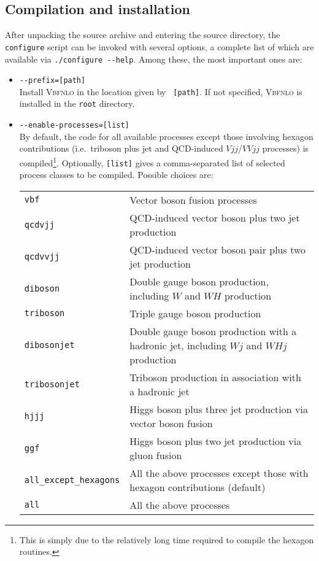 \documentclass[english,12pt]{article}
\begin{document}

\subsection{Compilation and installation}
\label{compilation}

After unpacking the source archive and entering the source directory, the {\tt
configure} script can be invoked with several options, a complete list of which are
available via {\tt ./configure~-{}-help}.  Among these, the most important ones
are:

\begin{itemize}
\item {\tt -{}-prefix=[path]} \\ Install \textsc{Vbfnlo} in the location given by {\tt
[path]}.  If not specified, \textsc{Vbfnlo} is installed in the {\tt root} directory.
\item {\tt -{}-enable-processes=[list]} \\ By default, the code for all
available processes except those involving hexagon contributions (i.e.\ triboson
plus jet and QCD-induced $Vjj$/$VVjj$ processes) is compiled\footnote{This is simply due to the relatively
long time required to compile the hexagon routines.}. Optionally, {\tt [list]}
gives a comma-separated list of selected process classes to be compiled. Possible
choices are:

\begin{tabular}{lp{}}
{\tt vbf} & Vector boson fusion processes \\ 
{\tt qcdvjj} & QCD-induced vector boson plus two jet production \\
{\tt qcdvvjj} & QCD-induced vector boson pair plus two jet production \\
{\tt diboson} & Double gauge boson production, including $W$ and $WH$ production \\ 
{\tt triboson} & Triple gauge boson production \\ 
{\tt dibosonjet} & Double gauge boson production with a hadronic jet, including $Wj$ and $WHj$ production \\ 
{\tt tribosonjet} & Triboson production in association with a hadronic jet \\ 
{\tt hjjj} & Higgs boson plus three jet production via vector boson fusion \\ 
{\tt ggf} & Higgs boson plus two jet production via gluon fusion \\
{\tt all\_except\_hexagons} & All the above processes except those with
                              hexagon contributions (default) \\
{\tt all} & All the above processes
\end{tabular}


\end{itemize}
\end{document}
